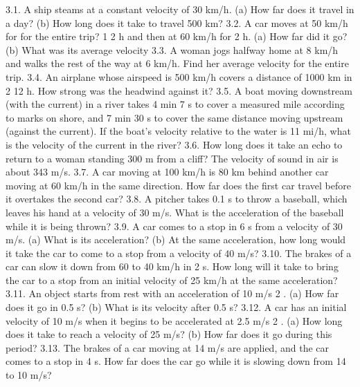 







3.1. A ship steams at a constant velocity of 30 km/h. (a) How far does it travel in a day? (b) How long does it take to travel
500 km?
3.2. A car moves at 50 km/h for
for the entire trip?
1
2
h and then at 60 km/h for 2 h. (a) How far did it go? (b) What was its average velocity
3.3. A woman jogs halfway home at 8 km/h and walks the rest of the way at 6 km/h. Find her average velocity for the
entire trip.
3.4. An airplane whose airspeed is 500 km/h covers a distance of 1000 km in 2 12 h. How strong was the headwind against
it?
3.5. A boat moving downstream (with the current) in a river takes 4 min 7 s to cover a measured mile according to marks
on shore, and 7 min 30 s to cover the same distance moving upstream (against the current). If the boat’s velocity
relative to the water is 11 mi/h, what is the velocity of the current in the river?
3.6. How long does it take an echo to return to a woman standing 300 m from a cliff? The velocity of sound in air is about
343 m/s.
3.7. A car moving at 100 km/h is 80 km behind another car moving at 60 km/h in the same direction. How far does the
first car travel before it overtakes the second car?
3.8. A pitcher takes 0.1 s to throw a baseball, which leaves his hand at a velocity of 30 m/s. What is the acceleration of
the baseball while it is being thrown?
3.9. A car comes to a stop in 6 s from a velocity of 30 m/s. (a) What is its acceleration? (b) At the same acceleration, how
long would it take the car to come to a stop from a velocity of 40 m/s?
3.10. The brakes of a car can slow it down from 60 to 40 km/h in 2 s. How long will it take to bring the car to a stop from
an initial velocity of 25 km/h at the same acceleration?
3.11. An object starts from rest with an acceleration of 10 m/s 2 . (a) How far does it go in 0.5 s? (b) What is its velocity
after 0.5 s?
3.12. A car has an initial velocity of 10 m/s when it begins to be accelerated at 2.5 m/s 2 . (a) How long does it take to reach
a velocity of 25 m/s? (b) How far does it go during this period?
3.13. The brakes of a car moving at 14 m/s are applied, and the car comes to a stop in 4 s. How far does the car go while it
is slowing down from 14 to 10 m/s?

